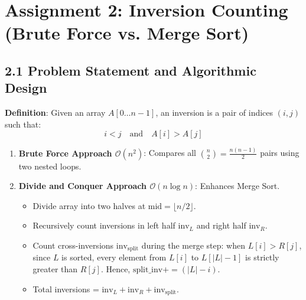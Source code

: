 \documentclass[12pt]{article}
\begin{document}
\newpage

\section*{Assignment 2: Inversion Counting (Brute Force vs. Merge Sort)}

\subsection*{2.1 Problem Statement and Algorithmic Design}
\textbf{Definition}: Given an array $A[0 \dots n-1]$, an inversion is a pair of indices $(i, j)$ such that:
\[
i < j \quad \text{and} \quad A[i] > A[j]
\]
\begin{enumerate}
    \item \textbf{Brute Force Approach $\mathcal{O}(n^2)$}: Compares all $\binom{n}{2} = \frac{n(n-1)}{2}$ pairs using two nested loops.
    \item \textbf{Divide and Conquer Approach $\mathcal{O}(n \log n)$}: Enhances Merge Sort.
    \begin{itemize}
        \item Divide array into two halves at $\text{mid} = \lfloor n/2 \rfloor$.
        \item Recursively count inversions in left half $\text{inv}_L$ and right half $\text{inv}_R$.
        \item Count cross-inversions $\text{inv}_{\text{split}}$ during the merge step: when $L[i] > R[j]$, since $L$ is sorted, every element from $L[i]$ to $L[|L|-1]$ is strictly greater than $R[j]$. Hence, $\text{split\_inv} += (|L| - i)$.
        \item Total inversions = $\text{inv}_L + \text{inv}_R + \text{inv}_{\text{split}}$.
    \end{itemize}
\end{enumerate}
\end{document}
